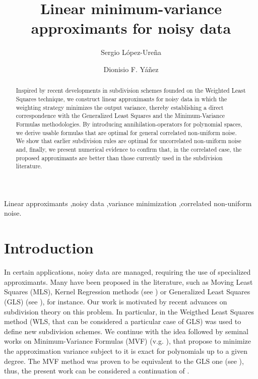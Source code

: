 \documentclass[preprint]{elsarticle}       %
\theoremstyle{plain}
\theoremstyle{remark}
\begin{document}
\begin{frontmatter}

	\title{Linear minimum-variance approximants for noisy data}
	
	\author[UV1]{Sergio L\'opez-Ure\~na}
	\author[UV1]{Dionisio F. Y\'a\~nez}
	\address[UV1]{Departament de Matem\`atiques.  Universitat de Val\`encia (EG) (Spain)}
	
	\begin{abstract}
        Inspired by recent developments in subdivision schemes founded on the Weighted Least Squares technique, we construct linear approximants for noisy data in which the weighting strategy minimizes the output variance, thereby establishing a direct correspondence with the Generalized Least Squares and the Minimum-Variance Formulas methodologies. By introducing annihilation-operators for polynomial spaces, we derive usable formulas that are optimal for general correlated non-uniform noise. We show that earlier subdivision rules are optimal for uncorrelated non-uniform noise and, finally, we present numerical evidence to confirm that, in the correlated case, the proposed approximants are better than those currently used in the subdivision literature.
	\end{abstract}
	
	\begin{keyword}
		Linear approximants \sep noisy data \sep variance minimization \sep correlated non-uniform noise.
	\end{keyword}
	
\end{frontmatter}


\section{Introduction}

In certain applications, noisy data are managed, requiring the use of specialized approximants. Many have been proposed in the literature, such as Moving Least Squares (MLS), Kernel Regression methods (see \cite{Levin98,TFM07}) or Generalized Least Squares (GLS) (see \cite{Aitken36}), for instance. %
Our work is motivated by recent advances on subdivision theory on this problem. In particular, in \cite{LUYA} the Weigthed Least Squares method (WLS, that can be considered a particular case of GLS) was used to define new subdivision schemes. We continue with the idea followed by seminal works on Minimum-Variance Formulas (MVF) (v.g. \cite{CR76}), that propose to minimize the approximation variance subject to it is exact for polynomials up to a given degree. The MVF method was proven to be equivalent to the GLS one (see \cite{Aitken36}), thus, the present work can be considered a continuation of \cite{LUYA}.
\end{document}
